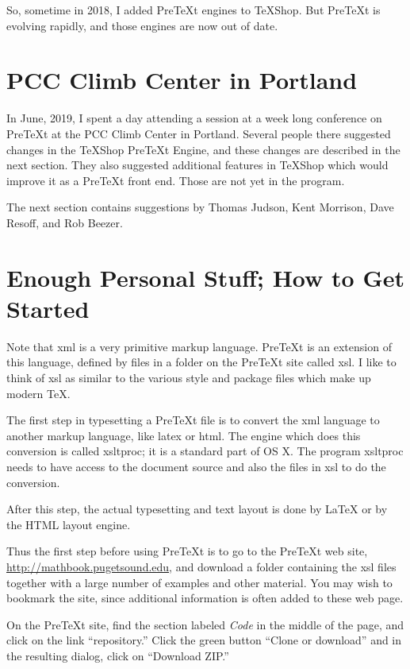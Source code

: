 \documentclass[11pt, oneside]{article}   	%
\begin{document}
So, sometime in 2018, I added PreTeXt engines to TeXShop. But PreTeXt is evolving rapidly, and those engines are now out of date.

\newpage

\section{PCC Climb Center in Portland}

In June, 2019, I spent a day attending a session at a week long  conference on PreTeXt at the PCC Climb Center in Portland.
Several people there suggested changes in the TeXShop PreTeXt Engine, and these changes are described in the next section. They also suggested additional features in TeXShop which would improve it as a PreTeXt front end. Those are not yet in the program.

The next section contains suggestions by Thomas Judson, Kent Morrison, Dave Resoff, and Rob Beezer.

\section{Enough Personal Stuff; How to Get Started}

Note that xml is a very primitive markup language. PreTeXt is an extension of this language, defined by files in
a folder on the PreTeXt site called xsl. I like to think of xsl as similar to the various style and package files which make up modern TeX. 

The first step in typesetting a PreTeXt file is to convert the xml language to another markup language, like latex or html. The engine which does this conversion is called xsltproc; it is a standard part of OS X. The program xsltproc needs to have access to the document source and also the files in xsl to do the conversion.

After this step, the actual typesetting and text layout is done by LaTeX or by the HTML layout engine.

Thus the first step before using PreTeXt is to go to the PreTeXt web site, \url{http://mathbook.pugetsound.edu},
and download a folder containing the xsl files together with a large number of examples and other material.
You may wish to bookmark the site, since additional information is often added to these web page.

On the PreTeXt site, find the section labeled {\em Code} in the middle of the page, and click on the link ``repository.'' Click the green button ``Clone or download'' and in the resulting dialog, click on ``Download ZIP.''
\end{document}
